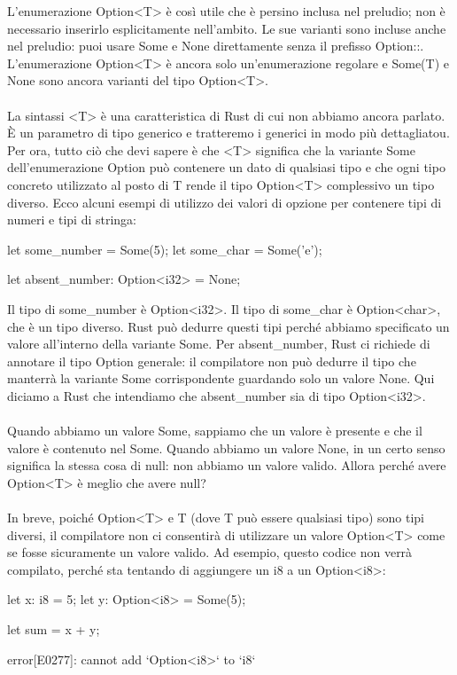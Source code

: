 \documentclass[11pt,a4paper]{article}
\begin{document}
L'enumerazione Option<T> è così utile che è persino inclusa nel preludio; non è necessario inserirlo esplicitamente nell'ambito. Le sue varianti sono incluse anche nel preludio: puoi usare Some e None direttamente senza il prefisso Option::. L'enumerazione Option<T> è ancora solo un'enumerazione regolare e Some(T) e None sono ancora varianti del tipo Option<T>.\\
\\
La sintassi <T> è una caratteristica di Rust di cui non abbiamo ancora parlato. È un parametro di tipo generico e tratteremo i generici in modo più dettagliatou. Per ora, tutto ciò che devi sapere è che <T> significa che la variante Some dell'enumerazione Option può contenere un dato di qualsiasi tipo e che ogni tipo concreto utilizzato al posto di T rende il tipo Option<T> complessivo un tipo diverso. Ecco alcuni esempi di utilizzo dei valori di opzione per contenere tipi di numeri e tipi di stringa:
\begin{rust}
    let some_number = Some(5);
    let some_char = Some('e');

    let absent_number: Option<i32> = None;
\end{rust}
Il tipo di some\_number è Option<i32>. Il tipo di some\_char è Option<char>, che è un tipo diverso. Rust può dedurre questi tipi perché abbiamo specificato un valore all'interno della variante Some. Per absent\_number, Rust ci richiede di annotare il tipo Option generale: il compilatore non può dedurre il tipo che manterrà la variante Some corrispondente guardando solo un valore None. Qui diciamo a Rust che intendiamo che absent\_number sia di tipo Option<i32>.\\
\\
Quando abbiamo un valore Some, sappiamo che un valore è presente e che il valore è contenuto nel Some. Quando abbiamo un valore None, in un certo senso significa la stessa cosa di null: non abbiamo un valore valido. Allora perché avere Option<T> è meglio che avere null?\\
\\
In breve, poiché Option<T> e T (dove T può essere qualsiasi tipo) sono tipi diversi, il compilatore non ci consentirà di utilizzare un valore Option<T> come se fosse sicuramente un valore valido. Ad esempio, questo codice non verrà compilato, perché sta tentando di aggiungere un i8 a un Option<i8>:
\begin{rust}
    let x: i8 = 5;
    let y: Option<i8> = Some(5);

    let sum = x + y;
    
error[E0277]: cannot add `Option<i8>` to `i8`

\end{rust}
\end{document}

